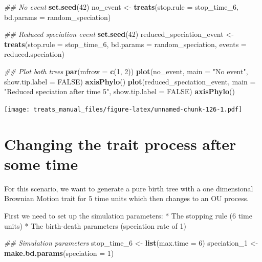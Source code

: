 \documentclass[
]{book}
\newenvironment{Shaded}{\begin{snugshade}}{\end{snugshade}}
\newcommand{\CommentTok}[1]{\textcolor[rgb]{0.56,0.35,0.01}{\textit{#1}}}
\newcommand{\DataTypeTok}[1]{\textcolor[rgb]{0.13,0.29,0.53}{#1}}
\newcommand{\DecValTok}[1]{\textcolor[rgb]{0.00,0.00,0.81}{#1}}
\newcommand{\KeywordTok}[1]{\textcolor[rgb]{0.13,0.29,0.53}{\textbf{#1}}}
\newcommand{\NormalTok}[1]{#1}
\newcommand{\OtherTok}[1]{\textcolor[rgb]{0.56,0.35,0.01}{#1}}
\newcommand{\StringTok}[1]{\textcolor[rgb]{0.31,0.60,0.02}{#1}}
\begin{document}
\begin{Shaded}
\begin{Highlighting}[]
\CommentTok{\#\# No event}
\KeywordTok{set.seed}\NormalTok{(}\DecValTok{42}\NormalTok{)}
\NormalTok{no\_event \textless{}{-}}\StringTok{ }\KeywordTok{treats}\NormalTok{(}\DataTypeTok{stop.rule =}\NormalTok{ stop\_time\_}\DecValTok{6}\NormalTok{,}
                 \DataTypeTok{bd.params =}\NormalTok{ random\_speciation)}

\CommentTok{\#\# Reduced speciation event}
\KeywordTok{set.seed}\NormalTok{(}\DecValTok{42}\NormalTok{)}
\NormalTok{reduced\_speciation\_event \textless{}{-}}\StringTok{ }\KeywordTok{treats}\NormalTok{(}\DataTypeTok{stop.rule =}\NormalTok{ stop\_time\_}\DecValTok{6}\NormalTok{,}
                                 \DataTypeTok{bd.params =}\NormalTok{ random\_speciation,}
                                 \DataTypeTok{events =}\NormalTok{ reduced.speciation)}

\CommentTok{\#\# Plot both trees}
\KeywordTok{par}\NormalTok{(}\DataTypeTok{mfrow =} \KeywordTok{c}\NormalTok{(}\DecValTok{1}\NormalTok{, }\DecValTok{2}\NormalTok{))}
\KeywordTok{plot}\NormalTok{(no\_event, }\DataTypeTok{main =} \StringTok{"No event"}\NormalTok{, }\DataTypeTok{show.tip.label =} \OtherTok{FALSE}\NormalTok{)}
\KeywordTok{axisPhylo}\NormalTok{()}
\KeywordTok{plot}\NormalTok{(reduced\_speciation\_event, }
     \DataTypeTok{main =} \StringTok{"Reduced speciation after time 5"}\NormalTok{, }
     \DataTypeTok{show.tip.label =} \OtherTok{FALSE}\NormalTok{)}
\KeywordTok{axisPhylo}\NormalTok{()}
\end{Highlighting}
\end{Shaded}

\texttt{[image: treats\_manual\_files/figure-latex/unnamed-chunk-126-1.pdf]}

\hypertarget{EG_change_trait}{%
\section{Changing the trait process after some time}\label{EG_change_trait}}

For this scenario, we want to generate a pure birth tree with a one dimensional Brownian Motion trait for 5 time units which then changes to an OU process.

First we need to set up the simulation parameters:
* The stopping rule (6 time units)
* The birth-death parameters (speciation rate of 1)

\begin{Shaded}
\begin{Highlighting}[]
\CommentTok{\#\# Simulation parameters}
\NormalTok{stop\_time\_}\DecValTok{6}\NormalTok{ \textless{}{-}}\StringTok{ }\KeywordTok{list}\NormalTok{(}\DataTypeTok{max.time =} \DecValTok{6}\NormalTok{)}
\NormalTok{speciation\_}\DecValTok{1}\NormalTok{ \textless{}{-}}\StringTok{ }\KeywordTok{make.bd.params}\NormalTok{(}\DataTypeTok{speciation =} \DecValTok{1}\NormalTok{)}
\end{Highlighting}
\end{Shaded}
\end{document}

